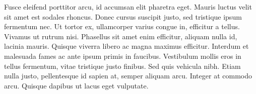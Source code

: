 \documentclass[
  UTF8, %
  12pt, %
]{essay} %
\begin{document}
Fusce eleifend porttitor arcu, id accumsan elit pharetra eget. Mauris luctus velit sit amet est sodales rhoncus. Donec cursus suscipit justo, sed tristique ipsum fermentum nec. Ut tortor ex, ullamcorper varius congue in, efficitur a tellus. Vivamus ut rutrum nisi. Phasellus sit amet enim efficitur, aliquam nulla id, lacinia mauris. Quisque viverra libero ac magna maximus efficitur. Interdum et malesuada fames ac ante ipsum primis in faucibus. Vestibulum mollis eros in tellus fermentum, vitae tristique justo finibus. Sed quis vehicula nibh. Etiam nulla justo, pellentesque id sapien at, semper aliquam arcu. Integer at commodo arcu. Quisque dapibus ut lacus eget vulputate.


\printbibliography

\end{document}
